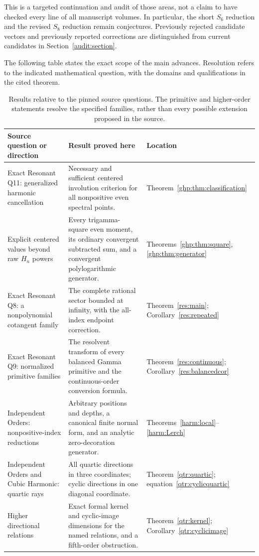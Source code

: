 \documentclass[11pt,a4paper]{article}
\numberwithin{equation}{section}
\theoremstyle{definition}
\theoremstyle{remark}
\begin{document}
This is a targeted continuation and audit of those areas, not a claim
to have checked every line of all manuscript volumes. In particular,
the short $S_6$ reduction and the revised $S_8$ reduction remain
conjectures. Previously rejected candidate vectors and previously
reported corrections are distinguished from current candidates in
Section~\ref{audit:section}.

The following table states the exact scope of the main advances.
Resolution refers to the indicated mathematical question, with the
domains and qualifications in the cited theorem.

\begin{table}[htbp]
\centering
\small
\begin{tabularx}{\textwidth}{@{}p{}Y p{0.19\textwidth}@{}}
\toprule
Source question or direction & Result proved here & Location\\
\midrule
Exact Resonant Q11: generalized harmonic cancellation
& Necessary and sufficient centered involution criterion for all
nonpositive even spectral points.
& Theorem~\ref{ghp:thm:classification}\\
\addlinespace
Explicit centered values beyond raw $H_n$ powers
& Every trigamma-square even moment, its ordinary convergent
subtracted sum, and a convergent polylogarithmic generator.
& Theorems~\ref{ghp:thm:square}, \ref{ghp:thm:generator}\\
\addlinespace
Exact Resonant Q8: a nonpolynomial cotangent family
& The complete rational sector bounded at infinity, with the
all-index endpoint correction.
& Theorem~\ref{res:main}; Corollary~\ref{res:repeated}\\
\addlinespace
Exact Resonant Q9: normalized primitive families
& The resolvent transform of every balanced Gamma primitive and
the continuous-order conversion formula.
& Theorem~\ref{res:continuous}; Corollary~\ref{res:balancedcor}\\
\addlinespace
Independent Orders: nonpositive-index reductions
& Arbitrary positions and depths, a canonical finite normal form,
and an analytic zero-decoration generator.
& Theorems~\ref{harm:local}--\ref{harm:Lerch}\\
\addlinespace
Independent Orders and Cubic Harmonic: quartic rays
& All quartic directions in three coordinates; cyclic directions
in one diagonal coordinate.
& Theorem~\ref{qtr:quartic}; equation~\eqref{qtr:cyclicquartic}\\
\addlinespace
Higher directional relations
& Exact formal kernel and cyclic-image dimensions for the named
relations, and a fifth-order obstruction.
& Theorem~\ref{qtr:kernel}; Corollary~\ref{qtr:cyclicimage}\\
\bottomrule
\end{tabularx}
\caption{Results relative to the pinned source questions. The primitive
and higher-order statements resolve the specified families, rather than
every possible extension proposed in the source.}
\label{scope:table}
\end{table}
\end{document}
